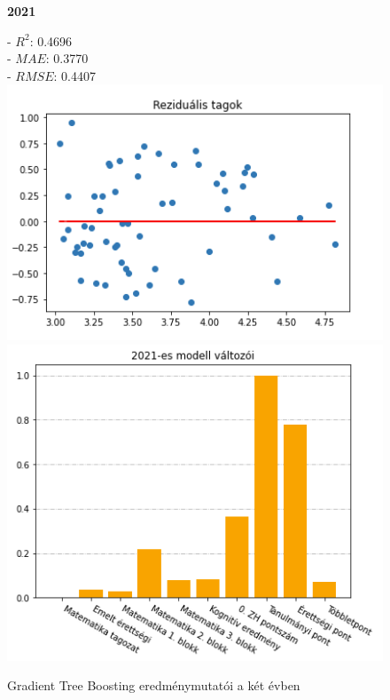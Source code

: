 \documentclass[12pt]{article}
\begin{document}
\begin{figure}[H]
    \begin{minipage}[b]{0.4\textwidth}
    \begin{center}
    \textbf{2021}
    \end{center}
    \raggedright
    - $R^2$: 0.4696 \\
    - $MAE$: 0.3770 \\
    - $RMSE$: 0.4407 \\
        \centering
        \includegraphics[width=1\textwidth, left]{kepek/residual2021_2.png} %
        \includegraphics[width=1\textwidth, left]{kepek/kumulalt2021_2.png} %
    \end{minipage}
   \caption{Gradient Tree Boosting eredménymutatói a két évben}
   \label{fig:kumulalt}
\end{figure}
\end{document}
